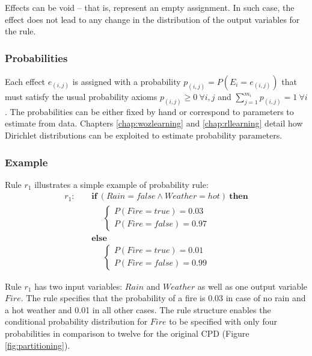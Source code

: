 Effects can be void -- that is, represent an empty assignment.  In such case, the effect does not lead to any change in the distribution of the output variables for the rule. 

\subsubsection*{Probabilities}

Each effect $e_{(i,j)}$ is assigned with a probability $p_{(i,j)} = P(E_i = e_{(i,j)})$ that must satisfy the usual probability axioms $p_{(i,j)} \geq 0  \ \forall i,j$ and $\sum_{j = 1}^{m_i} p_{(i,j)} = 1 \ \forall i$.  The probabilities can be either fixed by hand or correspond to parameters to estimate from data.  Chapters \ref{chap:wozlearning} and \ref{chap:rllearning} detail how Dirichlet distributions can be exploited to estimate probability parameters. 


\subsubsection*{Example}

Rule $r_1$ illustrates a simple example of probability rule:
\begin{align*}
r_1: \ \ \ \ \ & \textbf{if} \ (\mathit{Rain}\!=\!\mathit{false} \land \mathit{Weather}\!=\!\mathit{hot}) \ \textbf{then} \\
& \;\;\;\;\;  \begin{cases}
 P(\mathit{Fire}\!=\!\mathit{true}) = 0.03 \\ 
P(\mathit{Fire}\!=\!\mathit{false}) = 0.97
\end{cases} \\ 
& \textbf{else} \\
& \;\;\;\;\; \begin{cases}
P(\mathit{Fire}\!=\!\mathit{true}) = 0.01 \\
P(\mathit{Fire}\!=\!\mathit{false}) = 0.99
\end{cases} 
\end{align*}

Rule $r_1$ has two input variables: $\mathit{Rain}$ and $\mathit{Weather}$ as well as one output variable $\mathit{Fire}$. The rule specifies that the probability of a fire is 0.03 in case of no rain and a hot weather and 0.01 in all other cases.  The rule structure enables the conditional probability distribution for $\mathit{Fire}$ to be specified with only four probabilities in comparison to twelve for the original CPD (Figure \ref{fig:partitioning}). 

